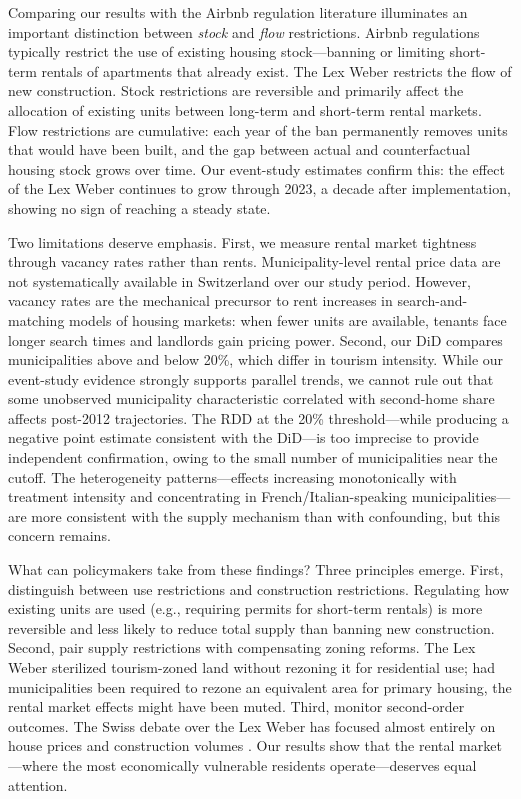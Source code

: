 \documentclass[12pt]{article}
\begin{document}
Comparing our results with the Airbnb regulation literature illuminates an important distinction between \textit{stock} and \textit{flow} restrictions. Airbnb regulations typically restrict the use of existing housing stock---banning or limiting short-term rentals of apartments that already exist. The Lex Weber restricts the flow of new construction. Stock restrictions are reversible and primarily affect the allocation of existing units between long-term and short-term rental markets. Flow restrictions are cumulative: each year of the ban permanently removes units that would have been built, and the gap between actual and counterfactual housing stock grows over time. Our event-study estimates confirm this: the effect of the Lex Weber continues to grow through 2023, a decade after implementation, showing no sign of reaching a steady state.

Two limitations deserve emphasis. First, we measure rental market tightness through vacancy rates rather than rents. Municipality-level rental price data are not systematically available in Switzerland over our study period. However, vacancy rates are the mechanical precursor to rent increases in search-and-matching models of housing markets: when fewer units are available, tenants face longer search times and landlords gain pricing power. Second, our DiD compares municipalities above and below 20\%, which differ in tourism intensity. While our event-study evidence strongly supports parallel trends, we cannot rule out that some unobserved municipality characteristic correlated with second-home share affects post-2012 trajectories. The RDD at the 20\% threshold---while producing a negative point estimate consistent with the DiD---is too imprecise to provide independent confirmation, owing to the small number of municipalities near the cutoff. The heterogeneity patterns---effects increasing monotonically with treatment intensity and concentrating in French/Italian-speaking municipalities---are more consistent with the supply mechanism than with confounding, but this concern remains.

What can policymakers take from these findings? Three principles emerge. First, distinguish between use restrictions and construction restrictions. Regulating how existing units are used (e.g., requiring permits for short-term rentals) is more reversible and less likely to reduce total supply than banning new construction. Second, pair supply restrictions with compensating zoning reforms. The Lex Weber sterilized tourism-zoned land without rezoning it for residential use; had municipalities been required to rezone an equivalent area for primary housing, the rental market effects might have been muted. Third, monitor second-order outcomes. The Swiss debate over the Lex Weber has focused almost entirely on house prices and construction volumes \citep{hilber2020economic, deville2022restricting}. Our results show that the rental market---where the most economically vulnerable residents operate---deserves equal attention.
\end{document}
